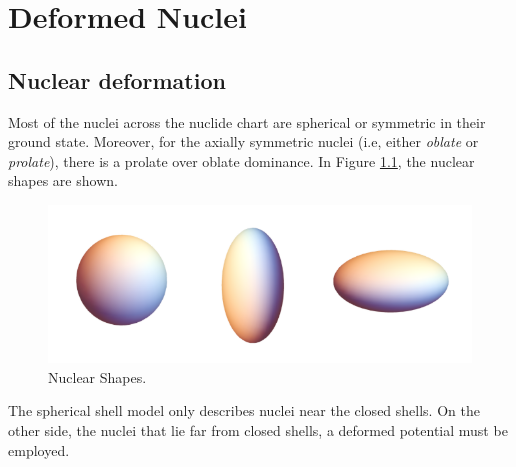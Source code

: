 \chapter{Deformed Nuclei}

\section{Nuclear deformation}

Most of the nuclei across the nuclide chart are spherical or symmetric in their ground state. Moreover, for the axially symmetric nuclei (i.e, either \emph{oblate} or \emph{prolate}), there is a prolate over oblate dominance. In Figure \ref{nuclear_shapes}, the nuclear shapes are shown.

\begin{figure}[ht]
    \centering
    \includegraphics[scale=0.3]{Chapters/Figures/nuclear_shapes.png}
    \caption{Nuclear Shapes.}
    \label{nuclear_shapes}
\end{figure}

The spherical shell model only describes nuclei near the closed shells. On the other side, the nuclei that lie far from closed shells, a deformed potential must be employed.